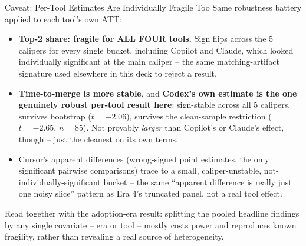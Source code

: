 \begin{frame}{Caveat: Per-Tool Estimates Are Individually Fragile Too}
Same robustness battery applied to each tool's own ATT:
\begin{itemize}
  \item \textbf{Top-2 share: fragile for ALL FOUR tools.} Sign flips
        across the 5 calipers for every single bucket, including
        Copilot and Claude, which looked individually significant at
        the main caliper -- the same matching-artifact signature used
        elsewhere in this deck to reject a result.
  \item \textbf{Time-to-merge is more stable}, and \textbf{Codex's own
        estimate is the one genuinely robust per-tool result here}:
        sign-stable across all 5 calipers, survives bootstrap
        ($t=-2.06$), survives the clean-sample restriction
        ($t=-2.65$, $n{=}85$). Not provably \emph{larger} than
        Copilot's or Claude's effect, though -- just the cleanest on
        its own terms.
  \item Cursor's apparent differences (wrong-signed point estimates,
        the only significant pairwise comparisons) trace to a small,
        caliper-unstable, not-individually-significant bucket -- the
        same ``apparent difference is really just one noisy slice''
        pattern as Era 4's truncated panel, not a real tool effect.
\end{itemize}
\vspace{0.3em}
Read together with the adoption-era result: splitting the pooled
headline findings by any single covariate -- era or tool -- mostly
costs power and reproduces known fragility, rather than revealing a
real source of heterogeneity.
\end{frame}

